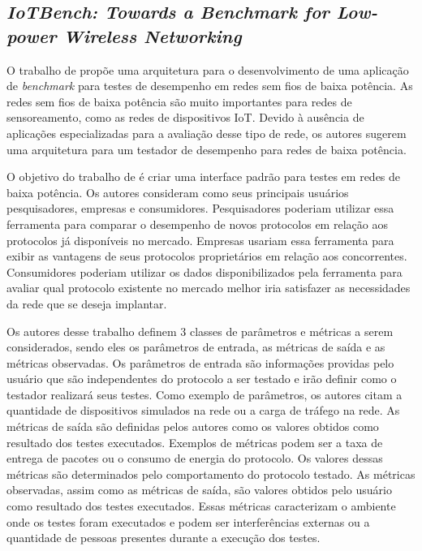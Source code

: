 \subsection{\textit{IoTBench: Towards a Benchmark for Low-power Wireless Networking}}

O trabalho de \cite{Boano2018} propõe uma arquitetura para o desenvolvimento de uma aplicação de \textit{benchmark} para testes de desempenho em redes sem fios de baixa potência.
As redes sem fios de baixa potência são muito importantes para redes de sensoreamento, como as redes de dispositivos IoT.
Devido à ausência de aplicações especializadas para a avaliação desse tipo de rede, os autores sugerem uma arquitetura para um testador de desempenho para redes de baixa potência.

O objetivo do trabalho de \cite{Boano2018} é criar uma interface padrão para testes em redes de baixa potência. Os autores consideram como seus principais usuários pesquisadores, empresas e consumidores.
Pesquisadores poderiam utilizar essa ferramenta para comparar o desempenho de novos protocolos em relação aos protocolos já disponíveis no mercado.
Empresas usariam essa ferramenta para exibir as vantagens de seus protocolos proprietários em relação aos concorrentes.
Consumidores poderiam utilizar os dados disponibilizados pela ferramenta para avaliar qual protocolo existente no mercado melhor iria satisfazer as necessidades da rede que se deseja implantar.

Os autores desse trabalho definem 3 classes de parâmetros e métricas a serem considerados, sendo eles os parâmetros de entrada, as métricas de saída e as métricas observadas.
Os parâmetros de entrada são informações providas pelo usuário que são independentes do protocolo a ser testado e irão definir como o testador realizará seus testes. Como exemplo de parâmetros, os autores citam a quantidade de dispositivos simulados na rede ou a carga de tráfego na rede.
As métricas de saída são definidas pelos autores como os valores obtidos como resultado dos testes executados. Exemplos de métricas podem ser a taxa de entrega de pacotes ou o consumo de energia do protocolo. Os valores dessas métricas são determinados pelo comportamento do protocolo testado.
As métricas observadas, assim como as métricas de saída, são valores obtidos pelo usuário como resultado dos testes executados. Essas métricas caracterizam o ambiente onde os testes foram executados e podem ser interferências externas ou a quantidade de pessoas presentes durante a execução dos testes.


